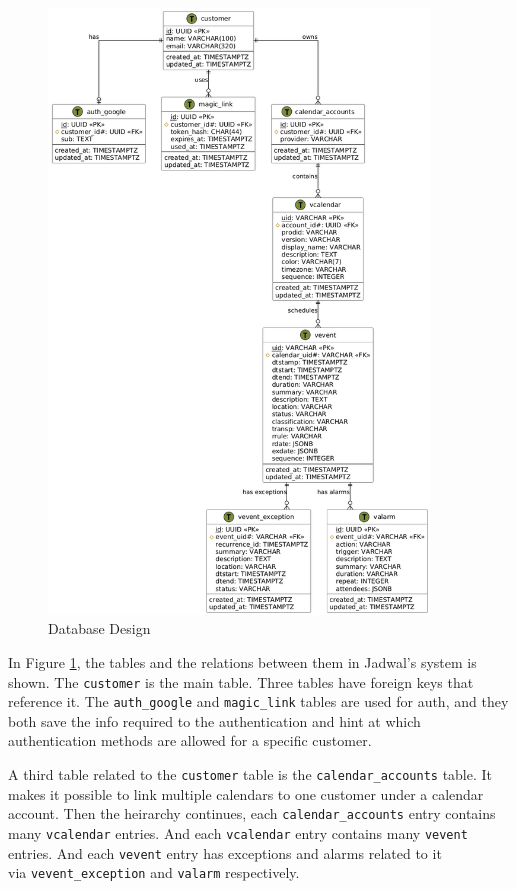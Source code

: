 \documentclass[12pt,a4paper]{report}
\begin{document}
\begin{figure}[!h]
    \centering
    \includegraphics[width=0.9\textwidth]{images/docs/diagrams/er/database/Database Design.png}
    \caption{Database Design}
    \label{fig:database-design}
\end{figure}

\newpage

In Figure \ref{fig:database-design}, the tables and the relations between them in Jadwal's system is shown. The \texttt{customer} is the main table. Three tables have foreign keys that reference it. The \texttt{auth\_google} and \texttt{magic\_link} tables are used for auth, and they both save the info required to the authentication and hint at which authentication methods are allowed for a specific customer.

A third table related to the \texttt{customer} table is the \texttt{calendar\_accounts} table. It makes it possible to link multiple calendars to one customer under a calendar account. Then the heirarchy continues, each \texttt{calendar\_accounts} entry contains many \texttt{vcalendar} entries. And each \texttt{vcalendar} entry contains many \texttt{vevent} entries. And each \texttt{vevent} entry has exceptions and alarms related to it\\via \texttt{vevent\_exception} and \texttt{valarm} respectively.
\end{document}
